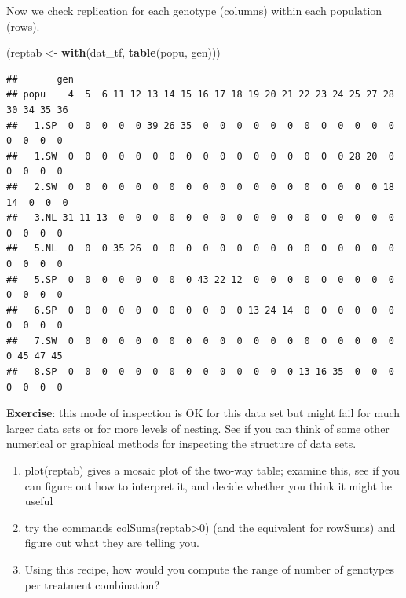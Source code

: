 \documentclass[
  12pt,
]{book}
\makeatletter
\newenvironment{Shaded}{\begin{snugshade}}{\end{snugshade}}
\newcommand{\KeywordTok}[1]{\textcolor[rgb]{0.13,0.29,0.53}{\textbf{#1}}}
\newcommand{\NormalTok}[1]{#1}
\newcommand{\StringTok}[1]{\textcolor[rgb]{0.31,0.60,0.02}{#1}}
\providecommand{\tightlist}{%
  \setlength{\itemsep}{0pt}\setlength{\parskip}{0pt}}
\newenvironment{kframe}{%
\medskip{}
\setlength{\fboxsep}{.8em}
\def\at@end@of@kframe{}%
\ifinner\ifhmode%
 \def\at@end@of@kframe{\end{minipage}}%
 \begin{minipage}{\columnwidth}%
\fi\fi%
\def\FrameCommand##1{\hskip\@totalleftmargin \hskip-\fboxsep
\colorbox{incolor}{##1}\hskip-\fboxsep
    \hskip-\linewidth \hskip-\@totalleftmargin \hskip\columnwidth}%
\MakeFramed {\advance\hsize-\width
  \@totalleftmargin\z@ \linewidth\hsize
  \@setminipage}}%
{\par\unskip\endMakeFramed%
\at@end@of@kframe}
\newenvironment{rmdblock}[1]
 {
 \begin{itemize}
 \renewcommand{\labelitemi}{
   \raisebox{-.7\height}[0pt][0pt]{
     {\setkeys{Gin}{width=3em,keepaspectratio}\texttt{[image: images/icons/\#1]}}
   }
 }
 \begin{kframe}
 \setlength{\fboxsep}{1em}
 \item
 }
 {
 \end{kframe}
 \end{itemize}
 }
\newenvironment{rmdcode}
  {\begin{rmdblock}{code}}
  {\end{rmdblock}}
\makeatother
\begin{document}
Now we check replication for each genotype (columns) within each population (rows).

\begin{Shaded}
\begin{Highlighting}[]
\NormalTok{(reptab <-}\StringTok{ }\KeywordTok{with}\NormalTok{(dat_tf, }\KeywordTok{table}\NormalTok{(popu, gen)))}
\end{Highlighting}
\end{Shaded}

\begin{verbatim}
##       gen
## popu    4  5  6 11 12 13 14 15 16 17 18 19 20 21 22 23 24 25 27 28 30 34 35 36
##   1.SP  0  0  0  0  0 39 26 35  0  0  0  0  0  0  0  0  0  0  0  0  0  0  0  0
##   1.SW  0  0  0  0  0  0  0  0  0  0  0  0  0  0  0  0  0 28 20  0  0  0  0  0
##   2.SW  0  0  0  0  0  0  0  0  0  0  0  0  0  0  0  0  0  0  0 18 14  0  0  0
##   3.NL 31 11 13  0  0  0  0  0  0  0  0  0  0  0  0  0  0  0  0  0  0  0  0  0
##   5.NL  0  0  0 35 26  0  0  0  0  0  0  0  0  0  0  0  0  0  0  0  0  0  0  0
##   5.SP  0  0  0  0  0  0  0  0 43 22 12  0  0  0  0  0  0  0  0  0  0  0  0  0
##   6.SP  0  0  0  0  0  0  0  0  0  0  0 13 24 14  0  0  0  0  0  0  0  0  0  0
##   7.SW  0  0  0  0  0  0  0  0  0  0  0  0  0  0  0  0  0  0  0  0  0 45 47 45
##   8.SP  0  0  0  0  0  0  0  0  0  0  0  0  0  0 13 16 35  0  0  0  0  0  0  0
\end{verbatim}

\begin{rmdcode}
\textbf{Exercise}: this mode of inspection is OK for this data set but might fail for much larger data sets or for more levels of nesting. See if you can think of some other numerical or graphical methods for inspecting the structure of data sets.

\begin{enumerate}
\def\labelenumi{\arabic{enumi}.}
\tightlist
\item
  plot(reptab) gives a mosaic plot of the two-way table; examine this, see if you can figure out how to interpret it, and decide whether you think it might be useful
\item
  try the commands colSums(reptab\textgreater0) (and the equivalent for rowSums) and figure out what they are telling you.
\item
  Using this recipe, how would you compute the range of number of genotypes per treatment combination?
\end{enumerate}
\end{rmdcode}
\end{document}
